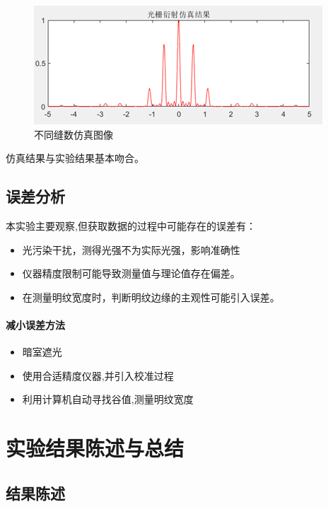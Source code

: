 \documentclass[a4paper]{../phyreport}
\begin{document}
\begin{figure}[H]
\begin{minipage}[b]{0.45\linewidth}
  \end{minipage}
  \begin{minipage}[b]{0.45\linewidth}
    \centering
\includegraphics[width=0.9\linewidth]{fig/仿真/5.png}
  \end{minipage}
  \caption{不同缝数仿真图像}
  \label{fig:不同缝数仿真}
\end{figure}
仿真结果与实验结果基本吻合。

\subsection{误差分析}
本实验主要观察,但获取数据的过程中可能存在的误差有：
\begin{itemize}
    \item 光污染干扰，测得光强不为实际光强，影响准确性
    \item 仪器精度限制可能导致测量值与理论值存在偏差。
    \item 在测量明纹宽度时，判断明纹边缘的主观性可能引入误差。
\end{itemize}

\paragraph{减小误差方法}
\begin{itemize}
  \item 暗室遮光
  \item 使用合适精度仪器,并引入校准过程
  \item 利用计算机自动寻找谷值,测量明纹宽度
\end{itemize}

\section{实验结果陈述与总结}
\subsection{结果陈述}
\end{document}

